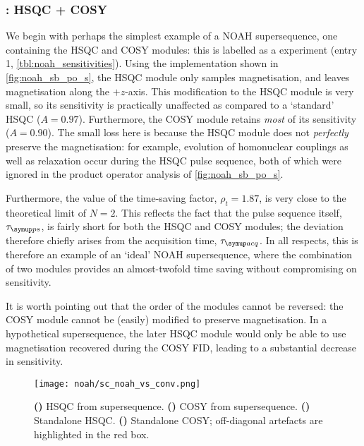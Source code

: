 \subsubsection{: HSQC + COSY}

We begin with perhaps the simplest example of a NOAH supersequence, one containing the HSQC and COSY modules: this is labelled as a  experiment (entry 1, \cref{tbl:noah_sensitivities}).
Using the implementation shown in \cref{fig:noah_sb_po_s}, the HSQC module only samples  magnetisation, and leaves  magnetisation along the $+z$-axis.
This modification to the HSQC module is very small, so its sensitivity is practically unaffected as compared to a `standard' HSQC ($A = 0.97$).
Furthermore, the COSY module retains \textit{most} of its sensitivity ($A = 0.90$).
The small loss here is because the HSQC module does not \textit{perfectly} preserve the  magnetisation: for example, evolution of homonuclear couplings as well as relaxation occur during the HSQC pulse sequence, both of which were ignored in the product operator analysis of \cref{fig:noah_sb_po_s}.

Furthermore, the value of the time-saving factor, $\rho_t = 1.87$, is very close to the theoretical limit of $N = 2$.
This reflects the fact that the pulse sequence itself, $\taups$, is fairly short for both the HSQC and COSY modules; the deviation therefore chiefly arises from the acquisition time, $\tauacq$.
In all respects, this is therefore an example of an `ideal' NOAH supersequence, where the combination of two modules provides an almost-twofold time saving without compromising on sensitivity.

It is worth pointing out that the order of the modules cannot be reversed: the COSY module cannot be (easily) modified to preserve  magnetisation.
In a hypothetical  supersequence, the later HSQC module would only be able to use magnetisation recovered during the COSY FID, leading to a substantial decrease in sensitivity.

\begin{figure}[!ht]
    \centering
    \texttt{[image: noah/sc\_noah\_vs\_conv.png]}%
    {\label{fig:sc_noah_vs_conv_noah_s}}%
    {\label{fig:sc_noah_vs_conv_noah_c}}%
    {\label{fig:sc_noah_vs_conv_conv_s}}%
    {\label{fig:sc_noah_vs_conv_conv_c}}%
    \caption[Comparison of spectra obtained from  and standalone experiments]{
        \textbf{()} HSQC from  supersequence.
        \textbf{()} COSY from  supersequence.
        \textbf{()} Standalone HSQC.
        \textbf{()} Standalone COSY; off-diagonal artefacts are highlighted in the red box.
    }
    \label{fig:sc_noah_vs_conv}
\end{figure}

